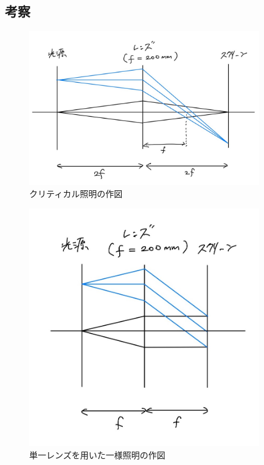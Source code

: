 \documentclass[titlepage]{jsarticle}
\begin{document}
\subsection{考察}

\begin{figure}[htbp]
    \centering
    \includegraphics[width=10cm]{critical.jpg}
    \caption{クリティカル照明の作図}
    \label{fig:critical}
\end{figure}

\begin{figure}[htbp]
    \centering
    \includegraphics[width=10cm]{singlekohler.jpg}
    \caption{単一レンズを用いた一様照明の作図}
    \label{fig:singlekohler}
\end{figure}
\end{document}
